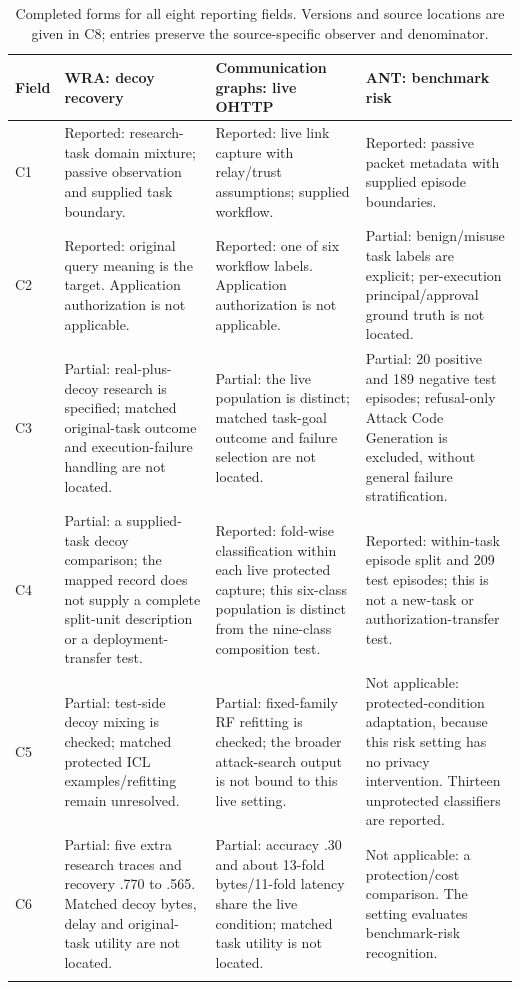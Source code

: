 \begin{table}[t]\centering\small
\caption{Completed forms for all eight reporting fields. Versions and source locations are given in C8; entries preserve the source-specific observer and denominator.}\label{tab:filled-checklists}
\setlength{\tabcolsep}{4pt}
\begin{tabularx}{\textwidth}{@{}P{.11\textwidth}YYY@{}}\toprule
Field & WRA: decoy recovery & Communication graphs: live OHTTP & ANT: benchmark risk \\\midrule
C1 & Reported: research-task domain mixture; passive observation and supplied task boundary. & Reported: live link capture with relay/trust assumptions; supplied workflow. & Reported: passive packet metadata with supplied episode boundaries. \\ \addlinespace[5pt]
C2 & Reported: original query meaning is the target. Application authorization is not applicable. & Reported: one of six workflow labels. Application authorization is not applicable. & Partial: benign/misuse task labels are explicit; per-execution principal/approval ground truth is not located. \\ \addlinespace[5pt]
C3 & Partial: real-plus-decoy research is specified; matched original-task outcome and execution-failure handling are not located. & Partial: the live population is distinct; matched task-goal outcome and failure selection are not located. & Partial: 20 positive and 189 negative test episodes; refusal-only Attack Code Generation is excluded, without general failure stratification. \\ \addlinespace[5pt]
C4 & Partial: a supplied-task decoy comparison; the mapped record does not supply a complete split-unit description or a deployment-transfer test. & Reported: fold-wise classification within each live protected capture; this six-class population is distinct from the nine-class composition test. & Reported: within-task episode split and 209 test episodes; this is not a new-task or authorization-transfer test. \\ \addlinespace[5pt]
C5 & Partial: test-side decoy mixing is checked; matched protected ICL examples/refitting remain unresolved. & Partial: fixed-family RF refitting is checked; the broader attack-search output is not bound to this live setting. & Not applicable: protected-condition adaptation, because this risk setting has no privacy intervention. Thirteen unprotected classifiers are reported. \\ \addlinespace[5pt]
C6 & Partial: five extra research traces and recovery .770 to .565. Matched decoy bytes, delay and original-task utility are not located. & Partial: accuracy .30 and about 13-fold bytes/11-fold latency share the live condition; matched task utility is not located. & Not applicable: a protection/cost comparison. The setting evaluates benchmark-risk recognition. \\ \addlinespace[5pt]

\end{tabularx}
\end{table}
